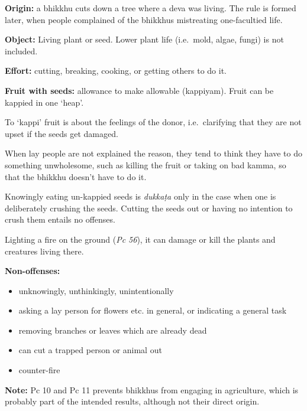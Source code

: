 \begin{multicols}{2}

\textbf{Origin:} a bhikkhu cuts down a tree where a deva was living. The
rule is formed later, when people complained of the bhikkhus mistreating
one-facultied life.

\textbf{Object:} Living plant or seed. Lower plant life (i.e.~mold,
algae, fungi) is not included.

\textbf{Effort:} cutting, breaking, cooking, or getting others to do it.

\textbf{Fruit with seeds:} allowance to make allowable (kappiyam). Fruit
can be kappied in one `heap'.

\columnbreak

To `kappi' fruit is about the feelings of the donor, i.e.~clarifying
that they are not upset if the seeds get damaged.

When lay people are not explained the reason, they tend to think they
have to do something unwholesome, such as killing the fruit or taking on
bad kamma, so that the bhikkhu doesn't have to do it.

Knowingly eating un-kappied seeds is \emph{dukkaṭa} only in the case
when one is deliberately crushing the seeds. Cutting the seeds out or
having no intention to crush them entails no offenses.

Lighting a fire on the ground (\emph{Pc 56}), it can damage or kill the
plants and creatures living there.

\textbf{Non-offenses:}

\begin{itemize}
\tightlist
\item
  unknowingly, unthinkingly, unintentionally
\item
  asking a lay person for flowers etc. in general, or indicating a
  general task
\item
  removing branches or leaves which are already dead
\item
  can cut a trapped person or animal out
\item
  counter-fire
\end{itemize}

\end{multicols}
\par
\enlargethispage{2\baselineskip}

\textbf{Note:} Pc 10 and Pc 11 prevents bhikkhus from engaging in
agriculture, which is probably part of the intended results, although
not their direct origin.

